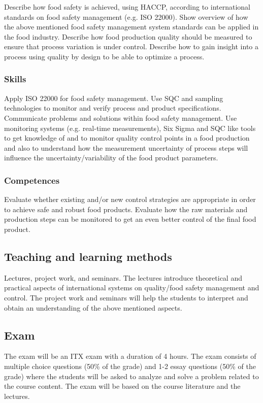 Describe how food safety is achieved, using HACCP, according to international standards on food safety management (e.g. ISO 22000). 
Show overview of how the above mentioned food safety management system standards can be applied in the food industry.
Describe how food production quality should be measured to ensure that process variation is under control.
Describe how to gain insight into a process using quality by design to be able to optimize a process.
 

\subsubsection{Skills} 

Apply ISO 22000 for food safety management.
Use SQC and sampling technologies to monitor and verify process and product specifications.
Communicate problems and solutions within food safety management.
Use monitoring systems (e.g. real-time measurements), Six Sigma and SQC like tools to get knowledge of and to monitor quality control points in a food production and also to understand how the measurement uncertainty of process steps will influence the uncertainty/variability of the food product parameters.
 

\subsubsection{Competences}  

Evaluate whether existing and/or new control strategies are appropriate in order to achieve safe and robust food products.
Evaluate how the raw materials and production steps can be monitored to get an even better control of the final food product.


\subsection{Teaching and learning methods}

Lectures, project work, and seminars. The lectures introduce theoretical and practical aspects of international systems on quality/food safety management and control. The project work and seminars will help the students to interpret and obtain an understanding of the above mentioned aspects.

\subsection{Exam}

The exam will be an ITX exam with a duration of 4 hours. The exam consists of multiple choice questions (50\% of the grade) and 1-2 essay questions (50\% of the grade) where the students will be asked to analyze and solve a problem related to the course content. The exam will be based on the course literature and the lectures.
